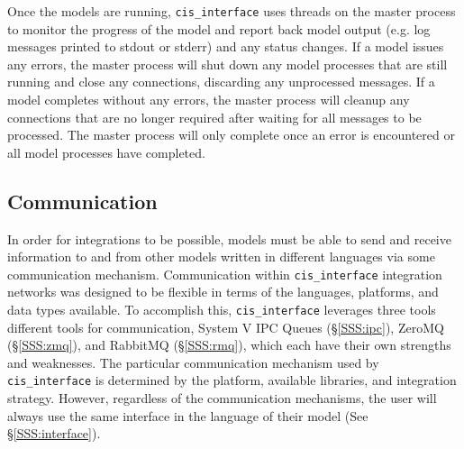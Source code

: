 \documentclass[journal]{IEEEtran}
\newcommand{\cis}{{\tt cis\_interface}{}}
\begin{document}
Once the models are running, {\cis} uses threads on the master process to monitor the progress of the model and report back model output (e.g. log messages printed to stdout or stderr) and any status changes. If a model issues any errors, the master process will shut down any model processes that are still running and close any connections, discarding any unprocessed messages. If a model completes without any errors, the master process will cleanup any connections that are no longer required after waiting for all messages to be processed. The master process will only complete once an error is encountered or all model processes have completed.


\subsection{Communication}\label{SS:communication}
%
In order for integrations to be possible, models must be able to send and receive information to and from other models written in different languages via some communication mechanism. 
Communication within {\cis} integration networks was designed to be flexible in terms of the 
languages, platforms, and data types available. To accomplish this, {\cis} leverages 
three tools different tools for communication, 
System V IPC Queues (\S\ref{SSS:ipc}), ZeroMQ (\S\ref{SSS:zmq}), and RabbitMQ (\S\ref{SSS:rmq}), 
which each have their own strengths and weaknesses. The 
particular communication mechanism used by {\cis} is determined by the platform, available libraries, and integration strategy. However, regardless of the communication mechanisms, the user will always use the same interface in the language of their model (See \S\ref{SSS:interface}). 

\end{document}
